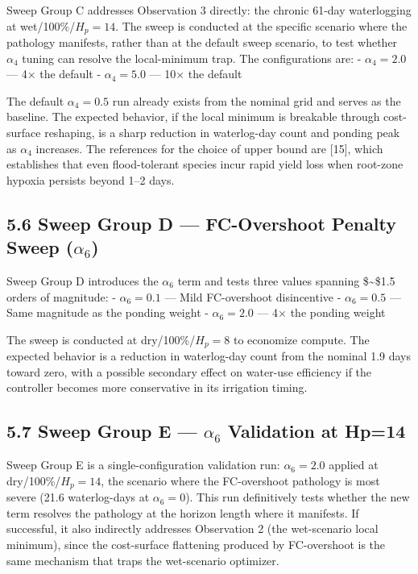 Sweep Group C addresses Observation 3 directly: the chronic 61-day
waterlogging at wet/100\%/\(H_p = 14\). The sweep is conducted at the
specific scenario where the pathology manifests, rather than at the
default sweep scenario, to test whether \(\alpha_4\) tuning can resolve
the local-minimum trap. The configurations are: - \(\alpha_4 = 2.0\) ---
4× the default - \(\alpha_4 = 5.0\) --- 10× the default

The default \(\alpha_4 = 0.5\) run already exists from the nominal grid
and serves as the baseline. The expected behavior, if the local minimum
is breakable through cost-surface reshaping, is a sharp reduction in
waterlog-day count and ponding peak as \(\alpha_4\) increases. The
references for the choice of upper bound are {[}15{]}, which establishes
that even flood-tolerant species incur rapid yield loss when root-zone
hypoxia persists beyond 1--2 days.

\subsection{\texorpdfstring{5.6 Sweep Group D --- FC-Overshoot Penalty
Sweep
(\(\alpha_6\))}{5.6 Sweep Group D --- FC-Overshoot Penalty Sweep (\textbackslash alpha\_6)}}\label{sweep-group-d-fc-overshoot-penalty-sweep-alpha_6}

Sweep Group D introduces the \(\alpha_6\) term and tests three values
spanning \$\sim\$1.5 orders of magnitude: - \(\alpha_6 = 0.1\) --- Mild
FC-overshoot disincentive - \(\alpha_6 = 0.5\) --- Same magnitude as the
ponding weight - \(\alpha_6 = 2.0\) --- 4× the ponding weight

The sweep is conducted at dry/100\%/\(H_p = 8\) to economize compute.
The expected behavior is a reduction in waterlog-day count from the
nominal 1.9 days toward zero, with a possible secondary effect on
water-use efficiency if the controller becomes more conservative in its
irrigation timing.

\subsection{\texorpdfstring{5.7 Sweep Group E --- \(\alpha_6\)
Validation at
Hp=14}{5.7 Sweep Group E --- \textbackslash alpha\_6 Validation at Hp=14}}\label{sweep-group-e-alpha_6-validation-at-hp14}

Sweep Group E is a single-configuration validation run:
\(\alpha_6 = 2.0\) applied at dry/100\%/\(H_p = 14\), the scenario where
the FC-overshoot pathology is most severe (21.6 waterlog-days at
\(\alpha_6 = 0\)). This run definitively tests whether the new term
resolves the pathology at the horizon length where it manifests. If
successful, it also indirectly addresses Observation 2 (the wet-scenario
local minimum), since the cost-surface flattening produced by
FC-overshoot is the same mechanism that traps the wet-scenario
optimizer.

